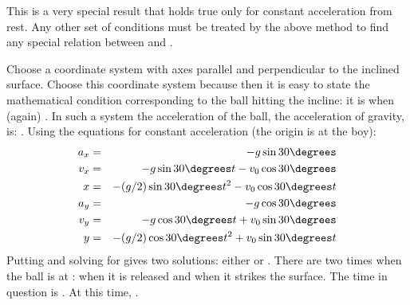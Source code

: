 {\begin{two-digit-list}
\item [9.] 






This is a very special result that holds true only for constant acceleration
from rest.
Any other set of conditions must be treated by the above method to find any
special relation between  and .

\item [10.] Choose a coordinate system with axes parallel and perpendicular to
the inclined surface.
Choose this coordinate system because then it is easy to
state the mathematical condition corresponding to the ball hitting the
incline: it is when (again) .
In such a system the acceleration of the ball, the acceleration of gravity,
is: .
\newline
Using the equations for constant acceleration (the origin is at the boy):
\begin{eqnarray*}
a_x & = & - g \sin30\degrees \\
v_x & = & - g \sin30\degrees t - v_0 \cos30\degrees \\
x   & = & - (g/2) \sin30\degrees t^2 - v_0 \cos30\degrees t \\
a_y & = & - g \cos30\degrees \\
v_y & = & - g \cos30\degrees t + v_0 \sin30\degrees \\
y   & = & - (g/2) \cos30\degrees t^2 + v_0 \sin30\degrees t
\end{eqnarray*}
Putting  and solving for  gives two solutions:
either  or .
There are two times when the ball is at : when it is released and when
it strikes the surface.
The time in question is .
At this time, .


\end{two-digit-list}}
